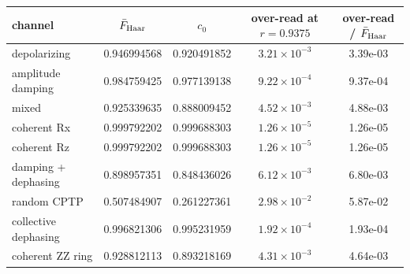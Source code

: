 \documentclass[10pt,a4paper]{article}
\begin{document}
\begin{longtable}{lcccc}
\toprule channel & $\bar F_{\rm Haar}$ & $c_0$ & over-read at $r=0.9375$ & over-read / $\bar F_{\rm Haar}$ \\ \midrule
depolarizing & 0.946994568 & 0.920491852 & $3.21\times 10^{-3}$ & 3.39e-03 \\
amplitude damping & 0.984759425 & 0.977139138 & $9.22\times 10^{-4}$ & 9.37e-04 \\
mixed & 0.925339635 & 0.888009452 & $4.52\times 10^{-3}$ & 4.88e-03 \\
coherent Rx & 0.999792202 & 0.999688303 & $1.26\times 10^{-5}$ & 1.26e-05 \\
coherent Rz & 0.999792202 & 0.999688303 & $1.26\times 10^{-5}$ & 1.26e-05 \\
damping + dephasing & 0.898957351 & 0.848436026 & $6.12\times 10^{-3}$ & 6.80e-03 \\
random CPTP & 0.507484907 & 0.261227361 & $2.98\times 10^{-2}$ & 5.87e-02 \\
collective dephasing & 0.996821306 & 0.995231959 & $1.92\times 10^{-4}$ & 1.93e-04 \\
coherent ZZ ring & 0.928812113 & 0.893218169 & $4.31\times 10^{-3}$ & 4.64e-03 \\
\bottomrule\end{longtable}
\end{document}
